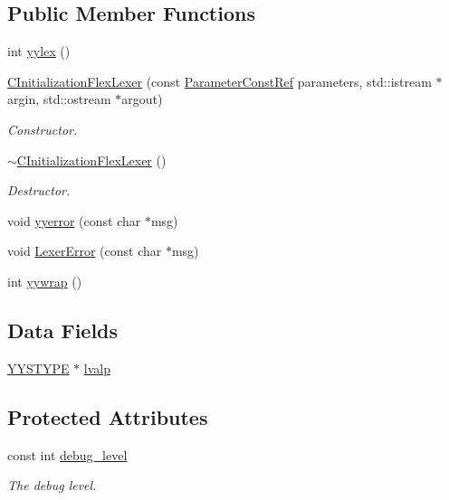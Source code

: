 \subsection*{Public Member Functions}
\begin{DoxyCompactItemize}
\item 
int \hyperlink{classCInitializationFlexLexer_ac862b7dee91d44d6dd5f8cca14429f10}{yylex} ()
\item 
\hyperlink{classCInitializationFlexLexer_a8a6f7adea340f945b7e352c3e2e0234b}{C\+Initialization\+Flex\+Lexer} (const \hyperlink{Parameter_8hpp_a37841774a6fcb479b597fdf8955eb4ea}{Parameter\+Const\+Ref} parameters, std\+::istream $\ast$argin, std\+::ostream $\ast$argout)
\begin{DoxyCompactList}\small\item\em Constructor. \end{DoxyCompactList}\item 
\hyperlink{classCInitializationFlexLexer_a49633db98ec6322a9727c242e6b37629}{$\sim$\+C\+Initialization\+Flex\+Lexer} ()
\begin{DoxyCompactList}\small\item\em Destructor. \end{DoxyCompactList}\item 
void \hyperlink{classCInitializationFlexLexer_a78b352766a89474e8becb50762c15150}{yyerror} (const char $\ast$msg)
\item 
void \hyperlink{classCInitializationFlexLexer_ae81556aaaf77659a5b1a83c9318301c6}{Lexer\+Error} (const char $\ast$msg)
\item 
int \hyperlink{classCInitializationFlexLexer_a4d73715f8ecba634f7724d62e90a2ca9}{yywrap} ()
\end{DoxyCompactItemize}
\subsection*{Data Fields}
\begin{DoxyCompactItemize}
\item 
\hyperlink{asn__parser_8cpp_a2ceb5b985e149f18e018b142cfdd7264}{Y\+Y\+S\+T\+Y\+PE} $\ast$ \hyperlink{classCInitializationFlexLexer_a1ae3c38baaaa5905f5cc6a38863f9dc7}{lvalp}
\end{DoxyCompactItemize}
\subsection*{Protected Attributes}
\begin{DoxyCompactItemize}
\item 
const int \hyperlink{classCInitializationFlexLexer_a7f920df59c77d437db114d090bc6b735}{debug\+\_\+level}
\begin{DoxyCompactList}\small\item\em The debug level. \end{DoxyCompactList}\end{DoxyCompactItemize}



